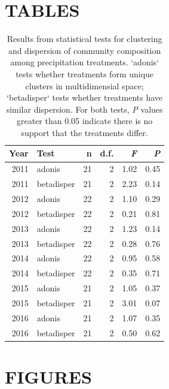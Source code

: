 \documentclass[fleqn,10pt,lineno]{wlpeerj} %
\begin{document}
\newpage{}

\section{TABLES}\label{tables}

\begin{table}[ht]
\centering
\caption{Results from statistical tests for clustering and dispersion of community composition among precipitation treatments. `adonis` tests whether treatments form unique clusters in multidimensial space; `betadisper` tests whether treatments have similar dispersion. For both tests, \emph{P} values greater than 0.05 indicate there is no support that the treatments differ.} 
\begingroup\normalsize
\begin{tabular}{rlrrrr}
  \hline
Year & Test & n & d.f. & \emph{F} & \emph{P} \\ 
  \hline
2011 & adonis &  21 &   2 & 1.02 & 0.45 \\ 
  2011 & betadisper &  21 &   2 & 2.23 & 0.14 \\ 
  2012 & adonis &  22 &   2 & 1.10 & 0.29 \\ 
  2012 & betadisper &  22 &   2 & 0.21 & 0.81 \\ 
  2013 & adonis &  22 &   2 & 1.23 & 0.14 \\ 
  2013 & betadisper &  22 &   2 & 0.28 & 0.76 \\ 
  2014 & adonis &  22 &   2 & 0.95 & 0.58 \\ 
  2014 & betadisper &  22 &   2 & 0.35 & 0.71 \\ 
  2015 & adonis &  21 &   2 & 1.05 & 0.37 \\ 
  2015 & betadisper &  21 &   2 & 3.01 & 0.07 \\ 
  2016 & adonis &  21 &   2 & 1.07 & 0.35 \\ 
  2016 & betadisper &  21 &   2 & 0.50 & 0.62 \\ 
   \hline
\end{tabular}
\endgroup
\end{table}

\newpage{}

\section{FIGURES}\label{figures}
\end{document}
